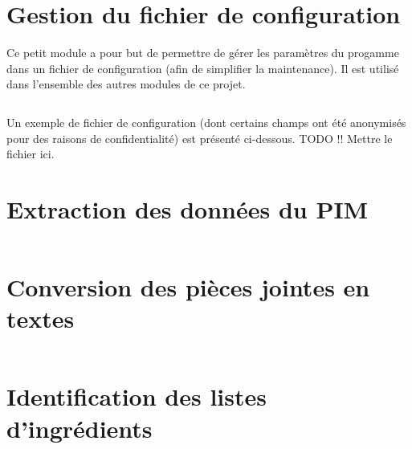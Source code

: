 \documentclass{report}
\begin{document}
        \section{Gestion du fichier de configuration}
        Ce petit module a pour but de permettre de gérer les paramètres du progamme dans un fichier de configuration (afin de simplifier la maintenance).
        Il est utilisé dans l'ensemble des autres modules de ce projet.
        \inputminted[fontsize=\scriptsize]{python}{../src/conf.py}
        Un exemple de fichier de configuration (dont certains champs ont été anonymisés pour des raisons de confidentialité) est présenté ci-dessous.
        TODO !! Mettre le fichier ici.

        \section{Extraction des données du PIM}
            \inputminted[fontsize=\scriptsize]{python}{../src/pimapi.py}
        
        \section{Conversion des pièces jointes en textes}
            \inputminted[fontsize=\scriptsize]{python}{../src/pimpdf.py}
        
        \section{Identification des listes d'ingrédients}
            \inputminted[fontsize=\scriptsize]{python}{../src/pimest.py} 
 
\end{document}
